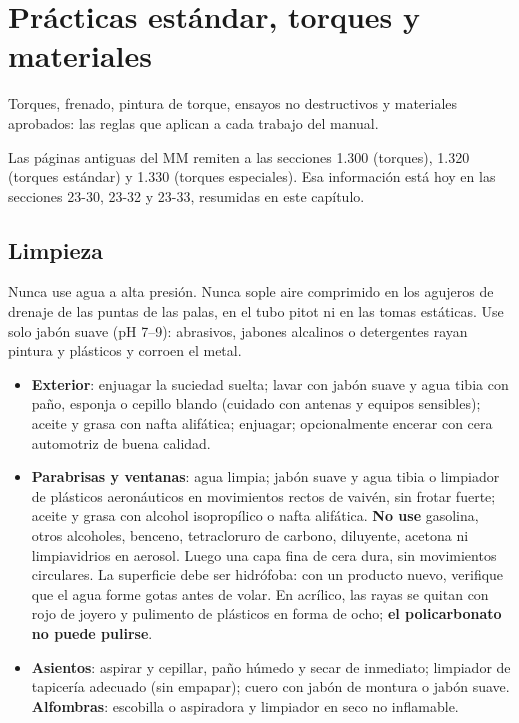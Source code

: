 \chapter{Prácticas estándar, torques y materiales}
\label{cap:mm-practicas}

\opening{Torques, frenado, pintura de torque, ensayos no destructivos y materiales aprobados: las reglas que aplican a cada trabajo del manual.}

\begin{nota}
Las páginas antiguas del MM remiten a las secciones 1.300 (torques), 1.320 (torques estándar) y 1.330 (torques especiales). Esa información está hoy en las secciones 23-30, 23-32 y 23-33, resumidas en este capítulo.
\end{nota}

\section{Limpieza}

\begin{precaucion}
Nunca use agua a alta presión. Nunca sople aire comprimido en los agujeros de drenaje de las puntas de las palas, en el tubo pitot ni en las tomas estáticas. Use solo jabón suave (pH 7--9): abrasivos, jabones alcalinos o detergentes rayan pintura y plásticos y corroen el metal.
\end{precaucion}

\begin{itemize}
\item \textbf{Exterior}: enjuagar la suciedad suelta; lavar con jabón suave y agua tibia con paño, esponja o cepillo blando (cuidado con antenas y equipos sensibles); aceite y grasa con nafta alifática; enjuagar; opcionalmente encerar con cera automotriz de buena calidad.
\item \textbf{Parabrisas y ventanas}: agua limpia; jabón suave y agua tibia o limpiador de plásticos aeronáuticos en movimientos rectos de vaivén, sin frotar fuerte; aceite y grasa con alcohol isopropílico o nafta alifática. \textbf{No use} gasolina, otros alcoholes, benceno, tetracloruro de carbono, diluyente, acetona ni limpiavidrios en aerosol. Luego una capa fina de cera dura, sin movimientos circulares. La superficie debe ser hidrófoba: con un producto nuevo, verifique que el agua forme gotas antes de volar. En acrílico, las rayas se quitan con rojo de joyero y pulimento de plásticos en forma de ocho; \textbf{el policarbonato no puede pulirse}.
\item \textbf{Asientos}: aspirar y cepillar, paño húmedo y secar de inmediato; limpiador de tapicería adecuado (sin empapar); cuero con jabón de montura o jabón suave. \textbf{Alfombras}: escobilla o aspiradora y limpiador en seco no inflamable.
\end{itemize}

